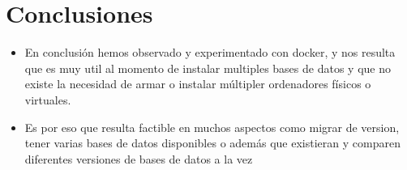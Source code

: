 \section{Conclusiones}
\begin{itemize}
	\item En conclusión hemos observado y experimentado con docker, y nos resulta que es muy util al momento de instalar multiples bases de datos y que no existe la necesidad de armar o instalar múltipler ordenadores físicos o virtuales.
	
	\item Es por eso que resulta factible en muchos aspectos como migrar de version, tener varias bases de datos disponibles o además que existieran y comparen diferentes versiones de bases de datos a la vez
\end{itemize}

\newpage
